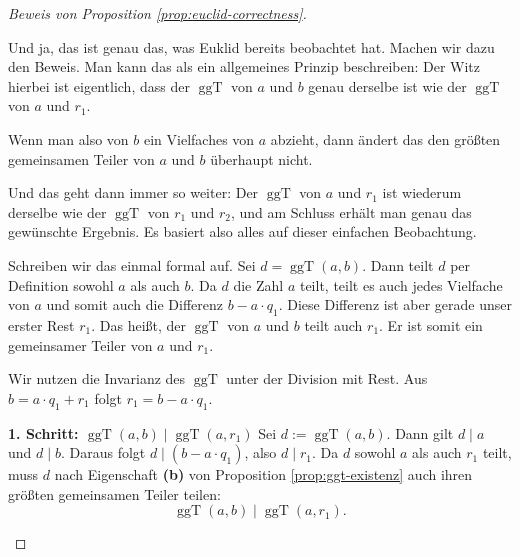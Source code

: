 \begin{proof}[Beweis von Proposition \ref{prop:euclid-correctness}]
\begin{spoken-clean}[00:33:39 - 00:35:00]
Und ja, das ist genau das, was Euklid bereits beobachtet hat. Machen wir dazu den Beweis. Man kann das als ein allgemeines Prinzip beschreiben: Der Witz hierbei ist eigentlich, dass der $\operatorname{ggT}$ von $a$ und $b$ genau derselbe ist wie der $\operatorname{ggT}$ von $a$ und $r_1$.

Wenn man also von $b$ ein Vielfaches von $a$ abzieht, dann ändert das den größten gemeinsamen Teiler von $a$ und $b$ überhaupt nicht.
\end{spoken-clean}

\begin{spoken-clean}[00:35:00 - 00:36:29]
Und das geht dann immer so weiter: Der $\operatorname{ggT}$ von $a$ und $r_1$ ist wiederum derselbe wie der $\operatorname{ggT}$ von $r_1$ und $r_2$, und am Schluss erhält man genau das gewünschte Ergebnis. Es basiert also alles auf dieser einfachen Beobachtung.

Schreiben wir das einmal formal auf. Sei $d = \operatorname{ggT}(a, b)$. Dann teilt $d$ per Definition sowohl $a$ als auch $b$. Da $d$ die Zahl $a$ teilt, teilt es auch jedes Vielfache von $a$ und somit auch die Differenz $b - a \cdot q_1$. Diese Differenz ist aber gerade unser erster Rest $r_1$. Das heißt, der $\operatorname{ggT}$ von $a$ und $b$ teilt auch $r_1$. Er ist somit ein gemeinsamer Teiler von $a$ und $r_1$.
\end{spoken-clean}

\begin{math-stroke}
\begin{short-proof}
Wir nutzen die Invarianz des $\operatorname{ggT}$ unter der Division mit Rest.
Aus $b = a \cdot q_1 + r_1$ folgt $r_1 = b - a \cdot q_1$.

\textbf{1. Schritt: $\operatorname{ggT}(a, b) \mid \operatorname{ggT}(a, r_1)$}
Sei $d := \operatorname{ggT}(a, b)$. Dann gilt $d \mid a$ und $d \mid b$.
Daraus folgt $d \mid (b - a \cdot q_1)$, also $d \mid r_1$.
Da $d$ sowohl $a$ als auch $r_1$ teilt, muss $d$ nach Eigenschaft \textbf{(b)} von Proposition \ref{prop:ggt-existenz} auch ihren größten gemeinsamen Teiler teilen:
\[
\operatorname{ggT}(a, b) \mid \operatorname{ggT}(a, r_1).
\]
\end{short-proof}
\end{math-stroke}


\end{proof}
